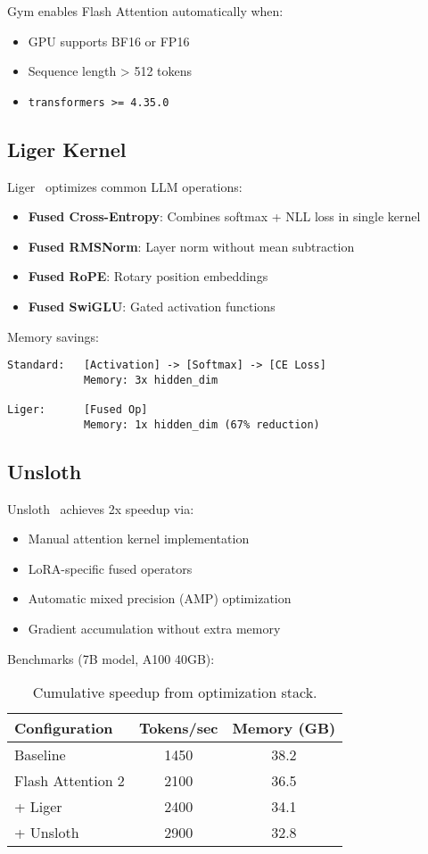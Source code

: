 \documentclass[11pt,letterpaper]{article}
\begin{document}
Gym enables Flash Attention automatically when:
\begin{itemize}
\item GPU supports BF16 or FP16
\item Sequence length > 512 tokens
\item \texttt{transformers >= 4.35.0}
\end{itemize}

\subsection{Liger Kernel}

Liger~\citep{hsu2024liger} optimizes common LLM operations:

\begin{itemize}
\item \textbf{Fused Cross-Entropy}: Combines softmax + NLL loss in single kernel
\item \textbf{Fused RMSNorm}: Layer norm without mean subtraction
\item \textbf{Fused RoPE}: Rotary position embeddings
\item \textbf{Fused SwiGLU}: Gated activation functions
\end{itemize}

Memory savings:
\begin{verbatim}
Standard:   [Activation] -> [Softmax] -> [CE Loss]
            Memory: 3x hidden_dim

Liger:      [Fused Op]
            Memory: 1x hidden_dim (67% reduction)
\end{verbatim}

\subsection{Unsloth}

Unsloth~\citep{unsloth2024} achieves 2x speedup via:
\begin{itemize}
\item Manual attention kernel implementation
\item LoRA-specific fused operators
\item Automatic mixed precision (AMP) optimization
\item Gradient accumulation without extra memory
\end{itemize}

Benchmarks (7B model, A100 40GB):
\begin{table}[h]
\centering
\begin{tabular}{lcc}
\toprule
Configuration & Tokens/sec & Memory (GB) \\
\midrule
Baseline & 1450 & 38.2 \\
Flash Attention 2 & 2100 & 36.5 \\
+ Liger & 2400 & 34.1 \\
+ Unsloth & 2900 & 32.8 \\
\bottomrule
\end{tabular}
\caption{Cumulative speedup from optimization stack.}
\end{table}
\end{document}

